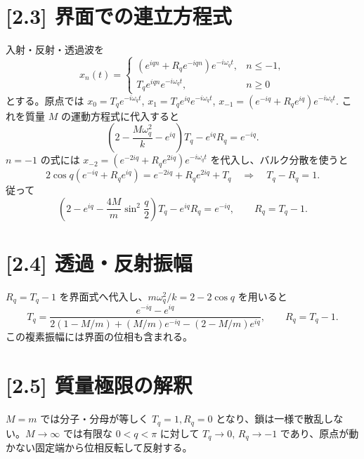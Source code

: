 \documentclass[11pt,a4paper]{article}
\begin{document}
\section*{[2.3] 界面での連立方程式}
入射・反射・透過波を
\[
x_n(t)=\begin{cases}(e^{iqn}+R_qe^{-iqn})e^{-i\omega_qt},&n\le-1,\\T_qe^{iqn}e^{-i\omega_qt},&n\ge0\end{cases}
\]
とする。原点では $x_0=T_qe^{-i\omega_qt}$, $x_1=T_qe^{iq}e^{-i\omega_qt}$, $x_{-1}=(e^{-iq}+R_qe^{iq})e^{-i\omega_qt}$. これを質量 $M$ の運動方程式に代入すると
\[
\left(2-\frac{M\omega_q^2}{k}-e^{iq}\right)T_q-e^{iq}R_q=e^{-iq}.
\]
$n=-1$ の式には $x_{-2}=(e^{-2iq}+R_qe^{2iq})e^{-i\omega_qt}$ を代入し、バルク分散を使うと
\[
2\cos q(e^{-iq}+R_qe^{iq})=e^{-2iq}+R_qe^{2iq}+T_q
\quad\Longrightarrow\quad \boxed{T_q-R_q=1}.
\]
従って
\[
\boxed{\left(2-e^{iq}-\frac{4M}{m}\sin^2\frac q2\right)T_q-e^{iq}R_q=e^{-iq},\qquad R_q=T_q-1}.
\]

\section*{[2.4] 透過・反射振幅}
$R_q=T_q-1$ を界面式へ代入し、$m\omega_q^2/k=2-2\cos q$ を用いると
\[
\boxed{T_q=\frac{e^{-iq}-e^{iq}}
{2(1-M/m)+(M/m)e^{-iq}-(2-M/m)e^{iq}}},\qquad
\boxed{R_q=T_q-1}.
\]
この複素振幅には界面の位相も含まれる。

\section*{[2.5] 質量極限の解釈}
$M=m$ では分子・分母が等しく $T_q=1,R_q=0$ となり、鎖は一様で散乱しない。$M\to\infty$ では有限な $0<q<\pi$ に対して $T_q\to0$, $R_q\to-1$ であり、原点が動かない固定端から位相反転して反射する。
\begin{center}
\end{center}
\end{document}
